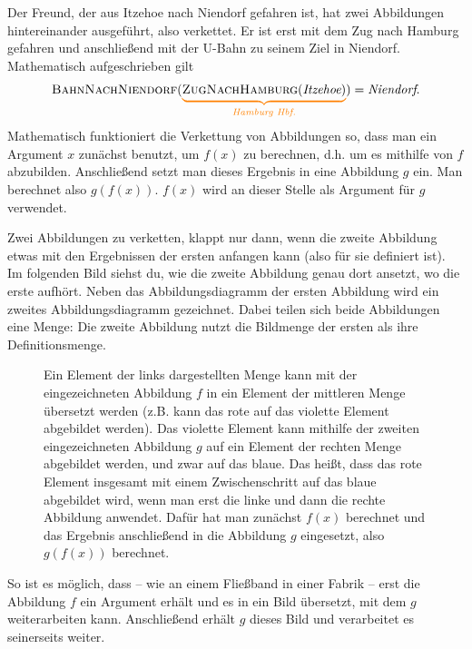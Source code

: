 \documentclass[../../main.tex]{subfiles}
\begin{document}
\begin{example}{}
    Der Freund, der aus Itzehoe nach Niendorf gefahren ist, hat zwei Abbildungen hintereinander ausgeführt, also verkettet. Er ist erst mit dem Zug nach Hamburg gefahren und anschließend mit der U-Bahn zu seinem Ziel in Niendorf. Mathematisch aufgeschrieben gilt \[\textsc{BahnNachNiendorf}(\colorbrace{\textsc{ZugNachHamburg}(\emph{Itzehoe})}{\emph{Hamburg Hbf.}})=\emph{Niendorf}.\]
\end{example}

Mathematisch funktioniert die Verkettung von Abbildungen so, dass man ein Argument $x$ zunächst benutzt, um $f(x)$ zu berechnen, d.h. um es mithilfe von $f$ abzubilden. Anschließend setzt man dieses Ergebnis in eine Abbildung $g$ ein. Man berechnet also $g(f(x))$. $f(x)$ wird an dieser Stelle als Argument für $g$ verwendet.

Zwei Abbildungen zu verketten, klappt nur dann, wenn die zweite Abbildung etwas mit den Ergebnissen der ersten anfangen kann (also für sie definiert ist). Im folgenden Bild siehst du, wie die zweite Abbildung genau dort ansetzt, wo die erste aufhört. Neben das Abbildungsdiagramm der ersten Abbildung wird ein zweites Abbildungsdiagramm gezeichnet. Dabei teilen sich beide Abbildungen eine Menge: Die zweite Abbildung nutzt die Bildmenge der ersten als ihre Definitionsmenge.

\begin{figure}[h!]
    \centering
    
    \caption{Ein Element der links dargestellten Menge kann mit der eingezeichneten Abbildung $f$ in ein Element der mittleren Menge übersetzt werden (z.B. kann das rote auf das violette Element abgebildet werden). Das violette Element kann mithilfe der zweiten eingezeichneten Abbildung $g$ auf ein Element der rechten Menge abgebildet werden, und zwar auf das blaue. Das heißt, dass das rote Element insgesamt mit einem Zwischenschritt auf das blaue abgebildet wird, wenn man erst die linke und dann die rechte Abbildung anwendet. Dafür hat man zunächst $f(x)$ berechnet und das Ergebnis anschließend in die Abbildung $g$ eingesetzt, also $g(f(x))$ berechnet.}
\end{figure}

So ist es möglich, dass -- wie an einem Fließband in einer Fabrik -- erst die Abbildung $f$ ein Argument erhält und es in ein Bild übersetzt, mit dem $g$ weiterarbeiten kann. Anschließend erhält $g$ dieses Bild und verarbeitet es seinerseits weiter.
\end{document}
